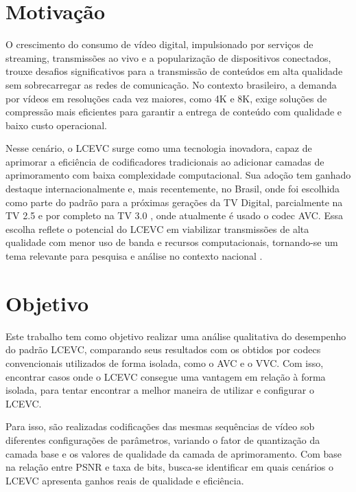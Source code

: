 \section{Motivação}

O crescimento do consumo de vídeo digital, impulsionado por serviços de streaming, transmissões ao vivo e a 
popularização de dispositivos conectados, trouxe desafios significativos para a transmissão de conteúdos em 
alta qualidade sem sobrecarregar as redes de comunicação. No contexto brasileiro, a demanda por vídeos em 
resoluções cada vez maiores, como 4K e 8K, exige soluções de compressão mais eficientes para garantir a 
entrega de conteúdo com qualidade e baixo custo operacional.

Nesse cenário, o \acrfull{LCEVC} surge como uma tecnologia inovadora, 
capaz de aprimorar a eficiência de codificadores tradicionais ao adicionar camadas de aprimoramento com baixa 
complexidade computacional. Sua adoção tem ganhado destaque internacionalmente e, mais recentemente, no Brasil, 
onde foi escolhida como parte do padrão para a próximas gerações da TV Digital, parcialmente na TV 2.5 e por 
completo na TV 3.0 \cite{tv_25}, onde atualmente é usado o codec \acrfull{AVC}. Essa escolha reflete o 
potencial do \acrshort{LCEVC} em viabilizar transmissões de alta qualidade com menor uso de banda e recursos 
computacionais, tornando-se um tema relevante para pesquisa e análise no contexto nacional \cite{lcevc_tvdigital, globo_lcevc}.

\section{Objetivo}

Este trabalho tem como objetivo realizar uma análise qualitativa do desempenho do padrão \acrfull{LCEVC}, comparando 
seus resultados com os obtidos por codecs convencionais utilizados de forma isolada, como o \acrshort{AVC} e o 
\acrshort{VVC}. Com isso, encontrar casos onde o \acrshort{LCEVC} consegue uma vantagem em relação à forma isolada,
para tentar encontrar a melhor maneira de utilizar e configurar o \acrshort{LCEVC}.

Para isso, são realizadas codificações das mesmas sequências de vídeo sob diferentes configurações
de parâmetros, variando o fator de quantização da camada base e os valores de qualidade da camada de aprimoramento. 
Com base na relação entre \acrshort{PSNR} e taxa de bits, busca-se identificar em quais cenários o \acrshort{LCEVC}
apresenta ganhos reais de qualidade e eficiência.

